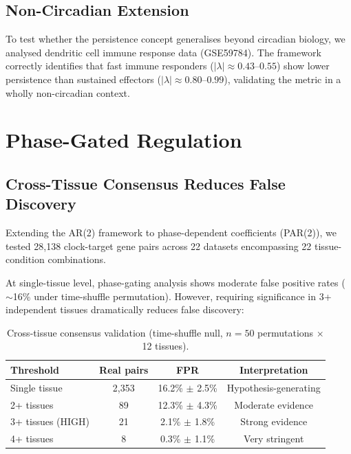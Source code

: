 \documentclass[11pt,letterpaper]{article}
\begin{document}
\subsection{Non-Circadian Extension}

To test whether the persistence concept generalises beyond circadian biology, we analysed dendritic cell immune response data (GSE59784). The framework correctly identifies that fast immune responders ($|\lambda| \approx 0.43$--$0.55$) show lower persistence than sustained effectors ($|\lambda| \approx 0.80$--$0.99$), validating the metric in a wholly non-circadian context.


\section{Phase-Gated Regulation}
\label{sec:phasegating}

\subsection{Cross-Tissue Consensus Reduces False Discovery}

Extending the AR(2) framework to phase-dependent coefficients (PAR(2)), we tested 28,138 clock-target gene pairs across 22 datasets encompassing 22 tissue-condition combinations.

At single-tissue level, phase-gating analysis shows moderate false positive rates ($\sim$16\% under time-shuffle permutation). However, requiring significance in 3+ independent tissues dramatically reduces false discovery:

\begin{table}[H]
\centering
\caption{Cross-tissue consensus validation (time-shuffle null, $n = 50$ permutations $\times$ 12 tissues).}
\label{tab:consensus}
\begin{tabular}{lccc}
\toprule
\textbf{Threshold} & \textbf{Real pairs} & \textbf{FPR} & \textbf{Interpretation} \\
\midrule
Single tissue & 2,353 & 16.2\% $\pm$ 2.5\% & Hypothesis-generating \\
2+ tissues & 89 & 12.3\% $\pm$ 4.3\% & Moderate evidence \\
3+ tissues (HIGH) & 21 & 2.1\% $\pm$ 1.8\% & Strong evidence \\
4+ tissues & 8 & 0.3\% $\pm$ 1.1\% & Very stringent \\
\bottomrule
\end{tabular}
\end{table}
\end{document}
